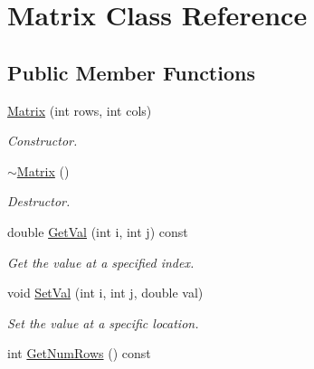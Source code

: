 \hypertarget{classMatrix}{
\section{Matrix Class Reference}
\label{d3/d3f/classMatrix}
}
\subsection*{Public Member Functions}
\begin{DoxyCompactItemize}
\item 
\hypertarget{classMatrix_a7213414e405fd1c81c394d5053721fa7}{
\hyperlink{classMatrix_a7213414e405fd1c81c394d5053721fa7}{Matrix} (int rows, int cols)}
\label{d3/d3f/classMatrix_a7213414e405fd1c81c394d5053721fa7}

\begin{DoxyCompactList}\small\item\em Constructor. \item\end{DoxyCompactList}\item 
\hypertarget{classMatrix_a9b1c3627f573d78a2f08623fdfef990f}{
\hyperlink{classMatrix_a9b1c3627f573d78a2f08623fdfef990f}{$\sim$Matrix} ()}
\label{d3/d3f/classMatrix_a9b1c3627f573d78a2f08623fdfef990f}

\begin{DoxyCompactList}\small\item\em Destructor. \item\end{DoxyCompactList}\item 
\hypertarget{classMatrix_ad7da71a311eeedf1ac24be5c6ada4dcb}{
double \hyperlink{classMatrix_ad7da71a311eeedf1ac24be5c6ada4dcb}{GetVal} (int i, int j) const }
\label{d3/d3f/classMatrix_ad7da71a311eeedf1ac24be5c6ada4dcb}

\begin{DoxyCompactList}\small\item\em Get the value at a specified index. \item\end{DoxyCompactList}\item 
\hypertarget{classMatrix_aa8c1c4e96ce2dff650a31dd0650db7db}{
void \hyperlink{classMatrix_aa8c1c4e96ce2dff650a31dd0650db7db}{SetVal} (int i, int j, double val)}
\label{d3/d3f/classMatrix_aa8c1c4e96ce2dff650a31dd0650db7db}

\begin{DoxyCompactList}\small\item\em Set the value at a specific location. \item\end{DoxyCompactList}\item 
\hypertarget{classMatrix_ae683a43cfb2cb84e8f6fa0297744b307}{
int \hyperlink{classMatrix_ae683a43cfb2cb84e8f6fa0297744b307}{GetNumRows} () const }
\label{d3/d3f/classMatrix_ae683a43cfb2cb84e8f6fa0297744b307}


\end{DoxyCompactItemize}
